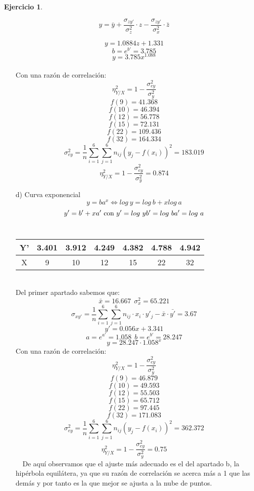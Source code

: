 \documentclass[a4paper, 12pt]{article}
\theoremstyle{definition}
\newtheorem{ej}{Ejercicio}
\begin{document}
\begin{ej}
\begin{enumerate}
    $$y = \bar{y} + \frac{\sigma_{zy'}}{\sigma_z^2}\cdot z - \frac{\sigma_{zy'}}{\sigma_x^2}\cdot \bar{z}$$
    
    $$y = 1.0884z + 1.331$$
    $$b = e^{b'} = 3.785$$
    $$y = 3.785x^{1.088}$$
    \\
    Con una razón de correlación:
    $$\eta_{Y/X}^2 = 1 - \frac{\sigma_{ey}^2}{\sigma_y^2}$$
    $$f(9) = 41.368$$
    $$f(10) = 46.394$$
    $$f(12) = 56.778$$
    $$f(15) = 72.131$$
    $$f(22) = 109.436$$
    $$f(32) = 164.334$$
    $$\sigma_{ey}^2 = \frac{1}{n} \displaystyle \sum_{i = 1}^6 \sum_{j = 1}^6 n_{ij} (y_j - f(x_i))^2 = 183.019$$
    $$\eta_{Y/X}^2 = 1 - \frac{\sigma_{ey}^2}{\sigma_y^2} = 0.874$$
    \item[d) ] Curva exponencial \\
    $$y = ba^x \iff log \ y = log \ b + xlog \ a$$
    $$y' = b' + xa' \text{ con } y' = log \ y \\ b' = log \ b \\ a' = log \ a$$
    \\ 
    \begin{tabular}{c|cccccc}
        Y' & 3.401 & 3.912 & 4.249 & 4.382 & 4.788 & 4.942\\ \hline
        X  & 9 & 10 & 12 & 15 & 22 & 32 
    \end{tabular} \\
    Del primer apartado sabemos que:
    $$\bar{x} = 16.667 \ \ \sigma_x^2 = 65.221$$
    $$\sigma_{xy'} = \frac{1}{n} \displaystyle \sum_{i = 1}^6 \sum_{j = 1}^6 n_{ij} \cdot x_i \cdot y'_j - \bar{x} \cdot \bar{y'} = 3.67$$
    $$y' = 0.056x + 3.341$$
    $$a = e^{a'} = 1.058 \ \ b = e^{b'} = 28.247$$
    $$y = 28.247 \cdot 1.058^x$$
     Con una razón de correlación:
    $$\eta_{Y/X}^2 = 1 - \frac{\sigma_{ey}^2}{\sigma_y^2}$$
    $$f(9) = 46.879$$
    $$f(10) = 49.593$$
    $$f(12) = 55.503$$
    $$f(15) = 65.712$$
    $$f(22) = 97.445$$
    $$f(32) = 171.083$$
    $$\sigma_{ey}^2 = \frac{1}{n} \displaystyle \sum_{i = 1}^6 \sum_{j = 1}^6 n_{ij} (y_j - f(x_i))^2 = 362.372$$
    $$\eta_{Y/X}^2 = 1 - \frac{\sigma_{ey}^2}{\sigma_y^2} = 0.75$$
    \
    \
    De aquí observamos que el ajuste más adecuado es el del apartado b, la hipérbola equilátera, ya que su razón de correlación se acerca más a 1 que las demás y por tanto es la que mejor se ajusta a la nube de puntos.
    \end{enumerate}
\end{ej}
\end{document}
